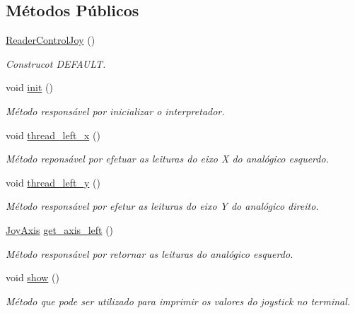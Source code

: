 \subsection*{Métodos Públicos}
\begin{DoxyCompactItemize}
\item 
\hyperlink{classReaderControlJoy_a1e11643f1bbb7216c7d49bc4f71d9cf0}{Reader\+Control\+Joy} ()\hypertarget{classReaderControlJoy_a1e11643f1bbb7216c7d49bc4f71d9cf0}{}\label{classReaderControlJoy_a1e11643f1bbb7216c7d49bc4f71d9cf0}

\begin{DoxyCompactList}\small\item\em Construcot D\+E\+F\+A\+U\+LT. \end{DoxyCompactList}\item 
void \hyperlink{classReaderControlJoy_ad73902de35a2805df6668e7838483497}{init} ()
\begin{DoxyCompactList}\small\item\em Método responsável por inicializar o interpretador. \end{DoxyCompactList}\item 
void \hyperlink{classReaderControlJoy_af302ef2987b702e00fdb47fb7fa66a96}{thread\+\_\+left\+\_\+x} ()
\begin{DoxyCompactList}\small\item\em Método reponsável por efetuar as leituras do eixo X do analógico esquerdo. \end{DoxyCompactList}\item 
void \hyperlink{classReaderControlJoy_a87a8111bad2612c7bc39c0c3843ec25f}{thread\+\_\+left\+\_\+y} ()
\begin{DoxyCompactList}\small\item\em Método responsável por efetur as leituras do eixo Y do analógico direito. \end{DoxyCompactList}\item 
\hyperlink{structJoyAxis}{Joy\+Axis} \hyperlink{classReaderControlJoy_a7b5bdaae0a6e1342c0b98bff39530edf}{get\+\_\+axis\+\_\+left} ()\hypertarget{classReaderControlJoy_a7b5bdaae0a6e1342c0b98bff39530edf}{}\label{classReaderControlJoy_a7b5bdaae0a6e1342c0b98bff39530edf}

\begin{DoxyCompactList}\small\item\em Método responsável por retornar as leituras do analógico esquerdo. \end{DoxyCompactList}\item 
void \hyperlink{classReaderControlJoy_a16d28747ea4de43f9652037b56047eeb}{show} ()\hypertarget{classReaderControlJoy_a16d28747ea4de43f9652037b56047eeb}{}\label{classReaderControlJoy_a16d28747ea4de43f9652037b56047eeb}

\begin{DoxyCompactList}\small\item\em Método que pode ser utilizado para imprimir os valores do joystick no terminal. \end{DoxyCompactList}\end{DoxyCompactItemize}
